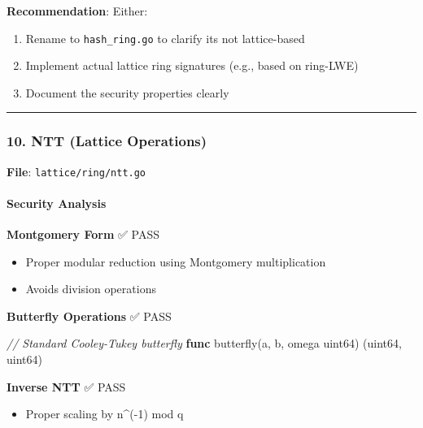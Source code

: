 \documentclass[
]{article}
\newenvironment{Shaded}{}{}
\newcommand{\CommentTok}[1]{\textcolor[rgb]{0.38,0.63,0.69}{\textit{#1}}}
\newcommand{\DataTypeTok}[1]{\textcolor[rgb]{0.56,0.13,0.00}{#1}}
\newcommand{\KeywordTok}[1]{\textcolor[rgb]{0.00,0.44,0.13}{\textbf{#1}}}
\newcommand{\NormalTok}[1]{#1}
\newcommand{\OperatorTok}[1]{\textcolor[rgb]{0.40,0.40,0.40}{#1}}
\providecommand{\tightlist}{%
  \setlength{\itemsep}{0pt}\setlength{\parskip}{0pt}}
\begin{document}
\textbf{Recommendation}: Either:

\begin{enumerate}
\def\labelenumi{\arabic{enumi}.}
\tightlist
\item
  Rename to \texttt{hash\_ring.go} to clarify it\textquotesingle s not
  lattice-based
\item
  Implement actual lattice ring signatures (e.g., based on ring-LWE)
\item
  Document the security properties clearly
\end{enumerate}

\begin{center}\rule{0.5\linewidth}{0.5pt}\end{center}

\subsubsection{10. NTT (Lattice
Operations)}\label{10-ntt-lattice-operations}

\textbf{File}: \texttt{lattice/ring/ntt.go}

\paragraph{Security Analysis}\label{security-analysis-7}

\textbf{Montgomery Form} ✅ PASS

\begin{itemize}
\tightlist
\item
  Proper modular reduction using Montgomery multiplication
\item
  Avoids division operations
\end{itemize}

\textbf{Butterfly Operations} ✅ PASS

\begin{Shaded}
\begin{Highlighting}[]
\CommentTok{// Standard Cooley{-}Tukey butterfly}
\KeywordTok{func}\NormalTok{ butterfly}\OperatorTok{(}\NormalTok{a}\OperatorTok{,}\NormalTok{ b}\OperatorTok{,}\NormalTok{ omega }\DataTypeTok{uint64}\OperatorTok{)} \OperatorTok{(}\DataTypeTok{uint64}\OperatorTok{,} \DataTypeTok{uint64}\OperatorTok{)}
\end{Highlighting}
\end{Shaded}

\textbf{Inverse NTT} ✅ PASS

\begin{itemize}
\tightlist
\item
  Proper scaling by n\^{}(-1) mod q
\end{itemize}
\end{document}

